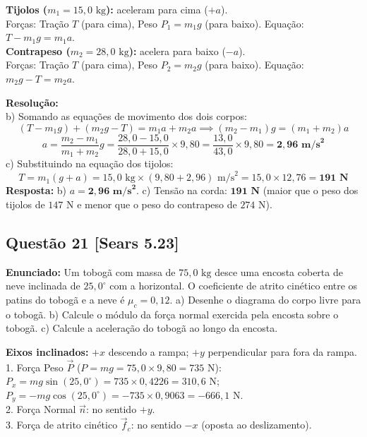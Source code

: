 \documentclass[11pt,a4paper]{article}
\begin{document}
\begin{dclbox}
\textbf{Tijolos ($m_1 = 15,0\text{ kg}$):} aceleram para cima ($+a$).\\
Forças: Tração $T$ (para cima), Peso $P_1 = m_1 g$ (para baixo). Equação: $T - m_1 g = m_1 a$.\\
\textbf{Contrapeso ($m_2 = 28,0\text{ kg}$):} acelera para baixo ($-a$).\\
Forças: Tração $T$ (para cima), Peso $P_2 = m_2 g$ (para baixo). Equação: $m_2 g - T = m_2 a$.
\end{dclbox}

\noindent
\textbf{Resolução:}\\
b) Somando as equações de movimento dos dois corpos:
\[ (T - m_1 g) + (m_2 g - T) = m_1 a + m_2 a \implies (m_2 - m_1)g = (m_1 + m_2)a \]
\[ a = \frac{m_2 - m_1}{m_1 + m_2} g = \frac{28,0 - 15,0}{28,0 + 15,0} \times 9,80 = \frac{13,0}{43,0} \times 9,80 = \mathbf{2,96\text{ m/s}^2} \]
c) Substituindo na equação dos tijolos:
\[ T = m_1 (g + a) = 15,0\text{ kg} \times (9,80 + 2,96)\text{ m/s}^2 = 15,0 \times 12,76 = \mathbf{191\text{ N}} \]
\textbf{Resposta:} b) $a = \mathbf{2,96\text{ m/s}^2}$. c) Tensão na corda: $\mathbf{191\text{ N}}$ (maior que o peso dos tijolos de $147\text{ N}$ e menor que o peso do contrapeso de $274\text{ N}$).

\vspace{0.3cm}
\subsection*{Questão 21 [Sears 5.23]}
\textbf{Enunciado:} Um tobogã com massa de $75,0\text{ kg}$ desce uma encosta coberta de neve inclinada de $25,0^\circ$ com a horizontal. O coeficiente de atrito cinético entre os patins do tobogã e a neve é $\mu_c = 0,12$. a) Desenhe o diagrama do corpo livre para o tobogã. b) Calcule o módulo da força normal exercida pela encosta sobre o tobogã. c) Calcule a aceleração do tobogã ao longo da encosta.

\begin{dclbox}
\textbf{Eixos inclinados:} $+x$ descendo a rampa; $+y$ perpendicular para fora da rampa.\\
1. Força Peso $\vec{P}$ ($P = mg = 75,0 \times 9,80 = 735\text{ N}$):\\
   $P_x = mg\sin(25,0^\circ) = 735 \times 0,4226 = 310,6\text{ N}$;\\
   $P_y = -mg\cos(25,0^\circ) = -735 \times 0,9063 = -666,1\text{ N}$.\\
2. Força Normal $\vec{n}$: no sentido $+y$.\\
3. Força de atrito cinético $\vec{f}_c$: no sentido $-x$ (oposta ao deslizamento).
\end{dclbox}
\end{document}
